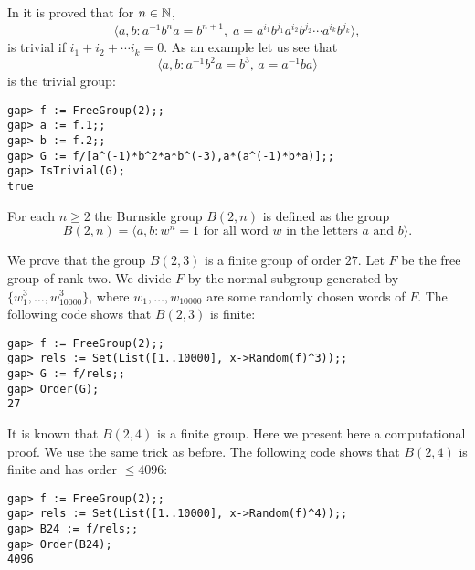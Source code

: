 \begin{example}
In \cite{MR1732210} it is proved that for $n\in\mathbb{N}$, 
\[
\langle a,b:a^{-1}b^na=b^{n+1},\;a=a^{i_1}b^{j_1}a^{i_2}b^{j_2}\cdots a^{i_k}b^{j_k}\rangle,
\]
is trivial if $i_1+i_2+\cdots i_k=0$. As an example let us see that
\[
\langle a,b:a^{-1}b^2a=b^3,\,a=a^{-1}ba\rangle
\]
is the trivial group: 
\begin{lstlisting}
gap> f := FreeGroup(2);;
gap> a := f.1;;
gap> b := f.2;;
gap> G := f/[a^(-1)*b^2*a*b^(-3),a*(a^(-1)*b*a)];;
gap> IsTrivial(G);
true
\end{lstlisting}
\end{example}

For each $n\geq2$ the Burnside group $B(2,n)$ is defined as the group 
\[
        B(2,n)=\langle a,b:w^n=1\text{ for all word $w$ in the letters $a$ and $b$}\rangle. 
\]

\begin{example}
	We prove that the group $B(2,3)$ is a finite group of order $27$. 
	Let $F$ be the free group of rank two. We divide $F$ by the
	normal subgroup generated by $\{w_1^3,\dots,w_{10000}^3\}$, where 
	$w_1,\dots,w_{10000}$ are some randomly chosen words of $F$. The following
	code shows that $B(2,3)$ is finite:
\begin{lstlisting}
gap> f := FreeGroup(2);;
gap> rels := Set(List([1..10000], x->Random(f)^3));;
gap> G := f/rels;;
gap> Order(G);
27
\end{lstlisting}
\end{example}

%

\begin{example}
	It is known that $B(2,4)$ is a finite group. Here we present here a
	computational proof.  We use the same trick as before.  The following code
	shows that $B(2,4)$ is finite and has order $\leq4096$:
\begin{lstlisting}
gap> f := FreeGroup(2);;
gap> rels := Set(List([1..10000], x->Random(f)^4));;
gap> B24 := f/rels;;
gap> Order(B24);
4096
\end{lstlisting}
\end{example}




